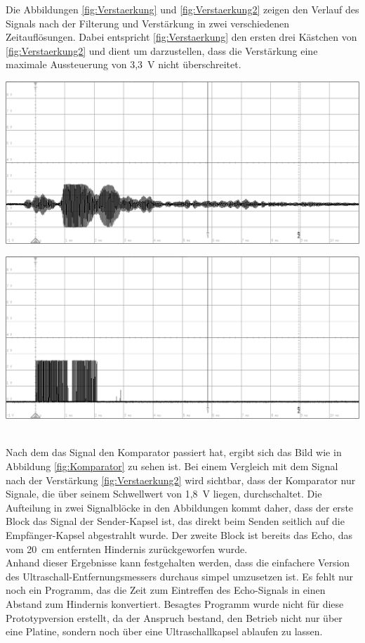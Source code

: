 Die Abbildungen \ref{fig:Verstaerkung} und \ref{fig:Verstaerkung2} zeigen den Verlauf des Signals nach der Filterung und Verstärkung in zwei verschiedenen Zeitauflösungen. Dabei entspricht \ref{fig:Verstaerkung} den ersten drei Kästchen von \ref{fig:Verstaerkung2} und dient um darzustellen, dass die Verstärkung eine maximale Aussteuerung von 3,3~V nicht überschreitet.\\
\begin{minipage}{0.5\textwidth}
\includegraphics[width=1\textwidth%
]{Abbildungen/MessungenP1/Signal-nach-Verstarkung2.png}
\label{fig:Verstaerkung2}
\end{minipage}
\begin{minipage}{0.5\textwidth}
\includegraphics[width=1\textwidth%
]{Abbildungen/MessungenP1/Signal-nach-Komparator.png}
\label{fig:Komparator}
\end{minipage}\\
Nach dem das Signal den Komparator passiert hat, ergibt sich das Bild wie in Abbildung \ref{fig:Komparator} zu sehen ist. Bei einem Vergleich mit dem Signal nach der Verstärkung \ref{fig:Verstaerkung2} wird sichtbar, dass der Komparator nur Signale, die über seinem Schwellwert von 1,8~V liegen, durchschaltet. Die Aufteilung in zwei Signalblöcke in den Abbildungen kommt daher, dass der erste Block das Signal der Sender-Kapsel ist, das direkt beim Senden seitlich auf die Empfänger-Kapsel abgestrahlt wurde. Der zweite Block ist bereits das Echo, das vom 20~cm entfernten Hindernis zurückgeworfen wurde.\\
Anhand dieser Ergebnisse kann festgehalten werden, dass die einfachere Version des Ultraschall-Entfernungsmessers durchaus simpel umzusetzen ist. Es fehlt nur noch ein Programm, das die Zeit zum Eintreffen des Echo-Signals in einen Abstand zum Hindernis konvertiert. Besagtes Programm wurde nicht für diese Prototypversion erstellt, da der Anspruch bestand, den Betrieb nicht nur über eine Platine, sondern noch über eine Ultraschallkapsel ablaufen zu lassen.
\newpage
